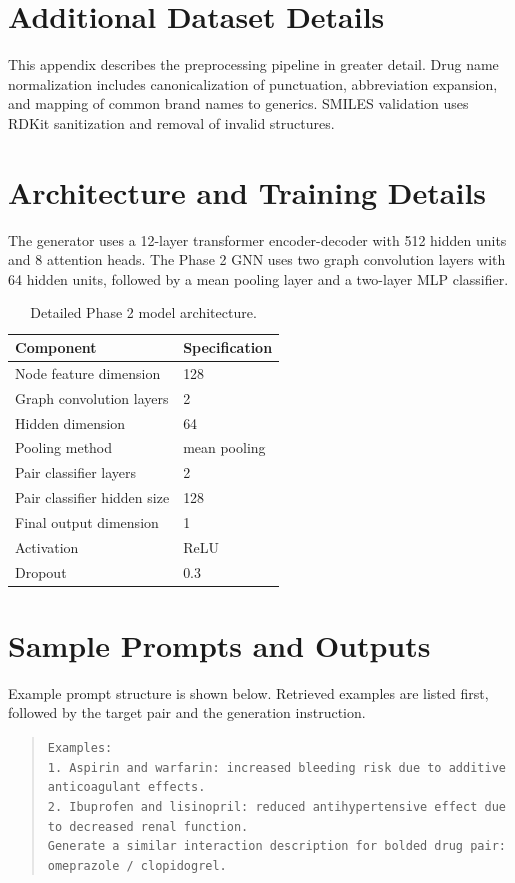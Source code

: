 \documentclass[conference]{IEEEtran}
\begin{document}
\appendices
\section{Additional Dataset Details}
This appendix describes the preprocessing pipeline in greater detail. Drug name normalization includes canonicalization of punctuation, abbreviation expansion, and mapping of common brand names to generics. SMILES validation uses RDKit sanitization and removal of invalid structures.

\section{Architecture and Training Details}
The generator uses a 12-layer transformer encoder-decoder with 512 hidden units and 8 attention heads. The Phase 2 GNN uses two graph convolution layers with 64 hidden units, followed by a mean pooling layer and a two-layer MLP classifier.

\begin{table}[t]
    \centering
    \caption{Detailed Phase 2 model architecture.}
    \label{tab:appendix_arch}
    \begin{tabular}{@{}ll@{}}
    \toprule
    Component & Specification \\
    \midrule
    Node feature dimension & 128 \\
    Graph convolution layers & 2 \\
    Hidden dimension & 64 \\
    Pooling method & mean pooling \\
    Pair classifier layers & 2 \\
    Pair classifier hidden size & 128 \\
    Final output dimension & 1 \\
    Activation & ReLU \\
    Dropout & 0.3 \\
    \bottomrule
    \end{tabular}
\end{table}

\section{Sample Prompts and Outputs}
Example prompt structure is shown below. Retrieved examples are listed first, followed by the target pair and the generation instruction.
\begin{quote}
\texttt{Examples:} \\
\texttt{1. Aspirin and warfarin: increased bleeding risk due to additive anticoagulant effects.} \\
\texttt{2. Ibuprofen and lisinopril: reduced antihypertensive effect due to decreased renal function.} \\
\texttt{Generate a similar interaction description for bolded drug pair: omeprazole / clopidogrel.}
\end{quote}
\end{document}
